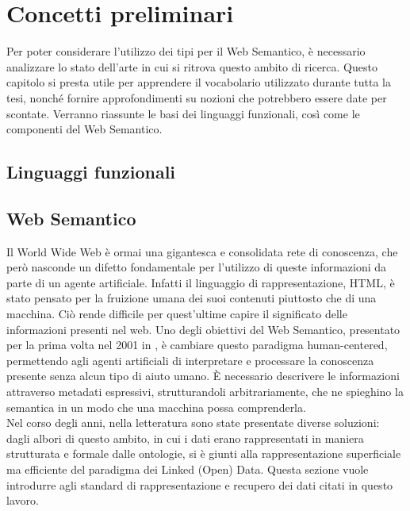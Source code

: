 \chapter[Concetti preliminari]{Concetti preliminari}
Per poter considerare l'utilizzo dei tipi per il Web Semantico, è necessario analizzare lo stato dell'arte in cui si ritrova questo ambito di ricerca.
Questo capitolo si presta utile per apprendere il vocabolario utilizzato durante tutta la tesi, nonché fornire approfondimenti su nozioni che potrebbero essere date per scontate.
Verranno riassunte le basi dei linguaggi funzionali, così come le componenti del Web Semantico.
\section[Linguaggi funzionali]{Linguaggi funzionali}
\section[Web Semantico]{Web Semantico}
Il World Wide Web è ormai una gigantesca e consolidata rete di conoscenza, che però nasconde un difetto fondamentale per l'utilizzo di queste informazioni da parte di un agente artificiale. Infatti il linguaggio di rappresentazione, HTML, è stato pensato per la fruizione umana dei suoi contenuti piuttosto che di una macchina. Ciò rende difficile per quest'ultime capire il significato delle informazioni presenti nel web. Uno degli obiettivi del Web Semantico, presentato per la prima volta nel 2001 in \cite{berners2001semantic}, è cambiare questo paradigma human-centered, permettendo agli agenti artificiali di interpretare e processare la conoscenza presente senza alcun tipo di aiuto umano. È necessario descrivere le informazioni attraverso metadati espressivi, strutturandoli arbitrariamente, che ne spieghino la semantica in un modo che una macchina possa comprenderla.\\
Nel corso degli anni, nella letteratura sono state presentate diverse soluzioni: dagli albori di questo ambito, in cui i dati erano rappresentati in maniera strutturata e formale dalle ontologie, si è giunti alla rappresentazione superficiale ma efficiente del paradigma dei Linked (Open) Data. Questa sezione vuole introdurre agli standard di rappresentazione e recupero dei dati citati in questo lavoro.

